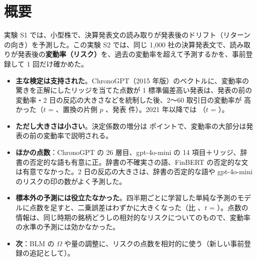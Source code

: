 \chapter*{概要}

実験 S1 では、小型株で、決算発表文の読み取りが発表後のドリフト（リターンの向き）を予測した。この実験 S2 では、同じ 1,000 社の決算発表文で、読み取りが発表後の\textbf{変動率（リスク）}を、過去の変動率を超えて予測するかを、事前登録して 1 回だけ確かめた。

\begin{keybox}[要点]
\begin{itemize}
\item \textbf{主な検定は支持された}。ChronoGPT（2015 年版）のベクトルに、変動率の驚きを正解にしたリッジを当てた点数が 1 標準偏差高い発表は、発表の前の変動率・2 日の反応の大きさなどを統制した後、2〜60 取引日の変動率が  高かった（$t$ = 、置換の片側 $p$ 、発表  件）。2021 年以降では （$t$ = ）。
\item \textbf{ただし大きさは小さい}。決定係数の増分は  ポイントで、変動率の大部分は発表の前の変動率で説明される。
\item \textbf{ほかの点数}：ChronoGPT の 26 層目、gpt-4o-mini の 14 項目＋リッジ、辞書の否定的な語も有意に正。辞書の不確実さの語、FinBERT の否定的な文は有意でなかった。2 日の反応の大きさは、辞書の否定的な語や gpt-4o-mini のリスクの印の数がよく予測した。
\item \textbf{標本外の予測には役立たなかった}。四半期ごとに学習した単純な予測のモデルに点数を足すと、二乗誤差はわずかに大きくなった（比 、$t$ = ）。点数の情報は、同じ時期の銘柄どうしの相対的なリスクについてのもので、変動率の水準の予測には効かなかった。
\item \textbf{次}：BLM の $\Omega$ や量の調整に、リスクの点数を相対的に使う（新しい事前登録の追記として）。
\end{itemize}
\end{keybox}
